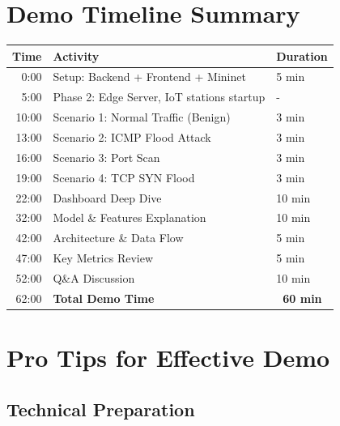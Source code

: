 \documentclass[12pt,a4paper]{article}
\begin{document}
\section{Demo Timeline Summary}

\begin{table}[h]
\centering
\begin{tabularx}{\textwidth}{|r|X|l|}
\hline
\textbf{Time} & \textbf{Activity} & \textbf{Duration} \\
\hline
0:00 & Setup: Backend + Frontend + Mininet & 5 min \\
\hline
5:00 & Phase 2: Edge Server, IoT stations startup & - \\
\hline
10:00 & Scenario 1: Normal Traffic (Benign) & 3 min \\
\hline
13:00 & Scenario 2: ICMP Flood Attack & 3 min \\
\hline
16:00 & Scenario 3: Port Scan & 3 min \\
\hline
19:00 & Scenario 4: TCP SYN Flood & 3 min \\
\hline
22:00 & Dashboard Deep Dive & 10 min \\
\hline
32:00 & Model \& Features Explanation & 10 min \\
\hline
42:00 & Architecture \& Data Flow & 5 min \\
\hline
47:00 & Key Metrics Review & 5 min \\
\hline
52:00 & Q\&A Discussion & 10 min \\
\hline
62:00 & \textbf{Total Demo Time} & \textbf{~60 min} \\
\hline
\end{tabularx}
\end{table}

\section{Pro Tips for Effective Demo}

\subsection{Technical Preparation}
\end{document}
